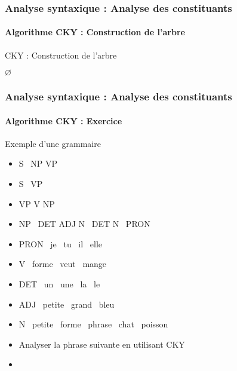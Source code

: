 \documentclass[xcolor=table]{beamer}
\begin{document}
\begin{frame}
\frametitle{Analyse syntaxique : Analyse des constituants}
\framesubtitle{Algorithme CKY : Construction de l'arbre}

\vspace{-6pt}
\begin{block}{CKY : Construction de l'arbre}
	\scriptsize\vspace{-3pt}
	\begin{algorithm}[H]
		
		
		 {
			\Retour $\varnothing$ \;
		}{
			\Retour {}\;
		}
		
		
		
	\end{algorithm}
\end{block}

\end{frame}

\begin{frame}
\frametitle{Analyse syntaxique : Analyse des constituants}
\framesubtitle{Algorithme CKY : Exercice}

\vspace{-6pt}
\begin{exampleblock}{Exemple d'une grammaire}
	\begin{itemize}
		\item S \textrightarrow\ NP VP 
		\item S \textrightarrow\ VP 
		\item VP \textrightarrow V NP
		\item NP \textrightarrow\ DET ADJ N \textbar\ DET N \textbar\ PRON 
		\item PRON \textrightarrow\ je \textbar\ tu \textbar\ il \textbar\ elle
		\item V \textrightarrow\ forme \textbar\ veut \textbar\ mange 
		\item DET \textrightarrow\ un \textbar\ une \textbar\ la \textbar\ le
		\item ADJ \textrightarrow\ petite \textbar\ grand \textbar\ bleu 
		\item N \textrightarrow\ petite \textbar\ forme \textbar\ phrase \textbar\ chat \textbar\ poisson
	\end{itemize}
\end{exampleblock}\vspace{-6pt}

\begin{itemize}
	\item Analyser la phrase suivante en utilisant CKY 
	\item {}
\end{itemize}

\end{frame}
\end{document}
